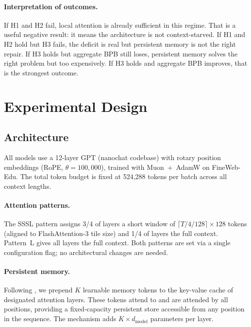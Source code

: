 \documentclass[11pt]{article}
\begin{document}
\paragraph{Interpretation of outcomes.}
If H1 and H2 fail, local attention is already sufficient in this
regime. That is a useful negative result: it means the architecture
is not context-starved.
If H1 and H2 hold but H3 fails, the deficit is real but persistent
memory is not the right repair.
If H3 holds but aggregate BPB still loses, persistent memory solves
the right problem but too expensively.
If H3 holds and aggregate BPB improves, that is the strongest outcome.


\section{Experimental Design}
\label{sec:design}

\subsection{Architecture}

All models use a 12-layer GPT (nanochat codebase) with rotary position
embeddings (RoPE, $\theta = 100{,}000$), trained with Muon~+~AdamW
on FineWeb-Edu. The total token budget is fixed at 524,288 tokens per
batch across all context lengths.

\paragraph{Attention patterns.}
The SSSL pattern assigns 3/4 of layers a short window of
$\lceil T/4 / 128 \rceil \times 128$ tokens (aligned to FlashAttention-3
tile size) and 1/4 of layers the full context. Pattern~L gives all layers
the full context. Both patterns are set via a single configuration flag;
no architectural changes are needed.

\paragraph{Persistent memory.}
Following \citet{sukhbaatar2019persistent}, we prepend $K$ learnable
memory tokens to the key-value cache of designated attention layers.
These tokens attend to and are attended by all positions, providing a
fixed-capacity persistent store accessible from any position in the
sequence. The mechanism adds $K \times d_{\text{model}}$ parameters
per layer.
\end{document}
